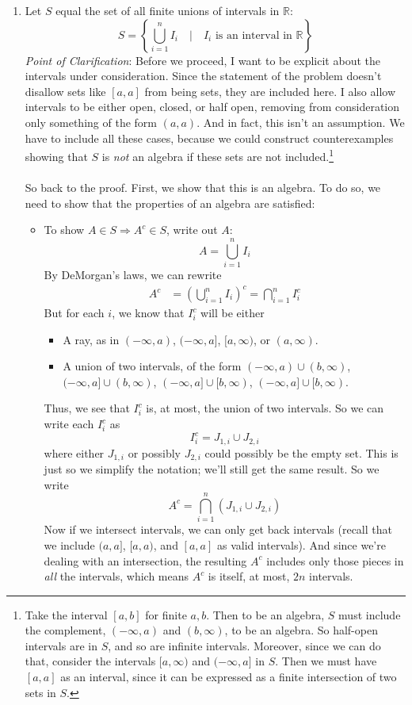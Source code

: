 \documentclass[12pt]{article}
\theoremstyle{plain}
\theoremstyle{definition}
\theoremstyle{remark}
\begin{document}
\begin{enumerate}
\item 
Let $S$ equal the set of all finite unions of intervals in $\mathbb{R}$:
\[
    S = \left\{ \bigcup^n_{i=1} I_i \quad | \quad
    I_i \text{ is an interval in }  \mathbb{R} 
    \right\}
\]
{\sl Point of Clarification}: Before we proceed, I want to be explicit about the intervals under consideration. Since the statement of the problem doesn't disallow sets like $[a,a]$ from being sets, they are included here. I also allow intervals to be either open, closed, or half open, removing from consideration only something of the form $(a,a)$. And in fact, this isn't an assumption. We have to include all these cases, because we could construct counterexamples showing that $S$ is \emph{not} an algebra if these sets are not included.\footnote{Take the interval $[a,b]$ for finite $a,b$. Then to be an algebra, $S$ must include the complement, $(-\infty,a)$ and $(b,\infty)$, to be an algebra. So half-open intervals are in $S$, and so are infinite intervals. Moreover, since we can do that, consider the intervals $[a,\infty)$ and $(-\infty, a]$ in $S$. Then we must have $[a,a]$ as an interval, since it can be expressed as a finite intersection of two sets in $S$.}
\\
\\
So back to the proof. First, we show that this is an algebra. To do so, we need to show that the properties of an algebra are satisfied:
\begin{itemize}
    \item To show $A\in{S}\Rightarrow A^c\in S$, write out $A$:
    \[ 
        A = \bigcup^n_{i=1} I_i  
    \]
    By DeMorgan's laws, we can rewrite
    \begin{align*}
        A^c &= \left(\bigcup^n_{i=1} I_i \right)^c 
        = \bigcap^n_{i=1} I^c_i  
    \end{align*}
    But for each $i$, we know that  $I_i^c$ will be either 
    \begin{itemize}
        \item A ray, as in $(-\infty,a)$, $(-\infty,a]$, $[a,\infty)$, or $(a,\infty)$.
        \item A union of two intervals, of the form $(-\infty, a) \cup (b, \infty)$, $(-\infty, a] \cup (b, \infty)$, $(-\infty, a] \cup [b, \infty)$, $(-\infty, a] \cup [b, \infty)$.
    \end{itemize}
Thus, we see that $I^c_i$ is, at most, the union of two intervals. So we can write each $I^c_i$ as 
\[
    I^c_i = J_{1,i} \cup J_{2,i}
\]
where either $J_{1,i}$ or possibly $J_{2,i}$ could possibly be the empty set. This is just so we simplify the notation; we'll still get the same result. So we write 
\[
    A^c = \bigcap^n_{i=1} \left(
    J_{1,i} \cup J_{2,i}\right)
\]
Now if we intersect intervals, we can only get back intervals (recall that we include $(a,a]$, $[a,a)$, and $[a,a]$ as valid intervals). And since we're dealing with an intersection, the resulting $A^c$ includes only those pieces in \emph{all} the intervals, which means $A^c$ is itself, at most, $2n$ intervals.


\end{itemize}
\end{enumerate}
\end{document}
